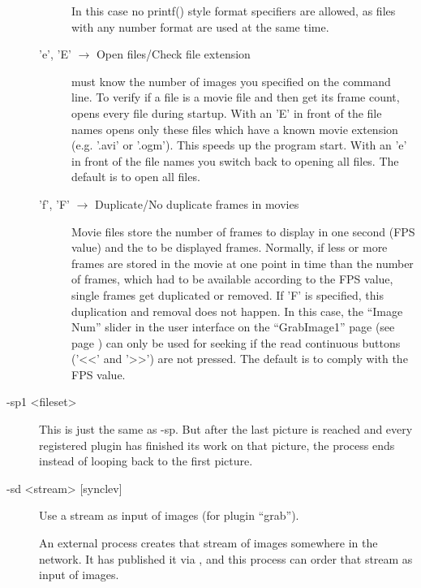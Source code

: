 \begin{description}
\begin{description}
    In this case no printf() style format specifiers are allowed, as
    files with any number format are used at the same time.

  \item['e', 'E' $\rightarrow$ Open files/Check file extension]
    \icewing{} must know the number of images you specified on the
    command line. To verify if a file is a movie file and then get
    its frame count, \icewing{} opens every file during
    startup. With an 'E' in front of the file names \icewing{} opens
    only these files which have a known movie extension
    (e.g. '.avi' or '.ogm'). This speeds up the program start. With
    an 'e' in front of the file names you switch back to opening all
    files. The default is to open all files.

  \item['f', 'F' $\rightarrow$ Duplicate/No duplicate frames in movies]
    Movie files store the number of frames to display in one second
    (FPS value) and the to be displayed frames. Normally, if less or
    more frames are stored in the movie at one point in time than
    the number of frames, which had to be available according to the
    FPS value, single frames get duplicated or removed. If 'F' is
    specified, this duplication and removal does not happen.
    In this case, the ``Image Num'' slider in the user interface on
    the ``GrabImage1'' page (see page )
    can only be used for seeking if the read continuous buttons
    ('\textless{}\textless{}' and '\textgreater{}\textgreater{}')
    are not pressed. The default is to comply with the FPS value.

  \end{description} %

\item[-sp1 \textless{}fileset\textgreater{}]
  This is just the same as -sp. But after the last picture is
  reached and every registered plugin has finished its work on that
  picture, the \icewing{} process ends instead of looping back to
  the first picture.

\item[-sd \textless{}stream\textgreater{} [synclev{]}]
  Use a \dacs{} stream as input of images (for plugin ``grab'').

  An external process creates that stream of images somewhere in the
  network. It has published it via \dacs{}, and this \icewing{}
  process can order that stream as input of images.


\end{description}
